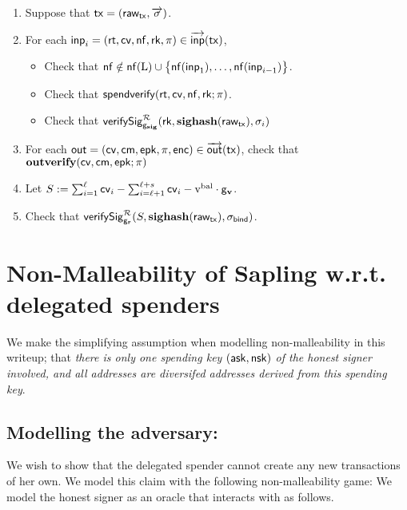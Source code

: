 \documentclass[11pt]{article}
\numberwithin{equation}{section} %
\numberwithin{figure}{section} %
\newcommand{\inp}{\ensuremath{\mathsf{inp}}\xspace}
\newcommand{\inps}{\ensuremath{\overrightarrow{\mathsf{inp}}}\xspace}
\newcommand{\outs}{\ensuremath{\overrightarrow{\mathsf{out}}}\xspace}
\newcommand{\out}{\ensuremath{\mathsf{out}}\xspace}
\newcommand{\set}[1]{\ensuremath{\left\{#1\right\}}\xspace}
\begin{document}
\begin{enumerate}
\item Suppose that $\mathsf{tx}=(\mathsf{raw_{tx}},\overrightarrow{\mathsf{\sigma}})$.
\item For each $\inp_i =(\rt,\cv,\nf,\rk,\prf)\in \inps(\tx)$,
 \begin{itemize}
  \item Check that $\nf \notin \nfof{\ledger}\cup \set{\nfof{\inp_1},\ldots,\nfof{\inp_{i-1}}}$.
  \item Check that $\mathsf{spendverify}(\mathsf{rt},\mathsf{cv},\mathsf{nf},\mathsf{rk};\pi)$.
  \item Check that $\mathsf{verifySig}^{\mathcal R}_{\mathsf{g}_{\mathbf{sig}}}(\mathsf{rk},\mathbf{sighash}(\mathsf{raw_{tx}}),\sigma_i)$
 \end{itemize}
\item For each $\out = (\cv,\cm,\epk,\prf,\noteenc)\in\outs(\tx)$, check that  $\mathbf{outverify}(\mathsf{cv},\mathsf{cm},\mathsf{epk};\pi)$
\item Let $S:=\sum_{i=1}^\ell \mathsf{cv}_i - \sum_{i=\ell+1}^{\ell+s}\mathsf{cv}_i-\mathrm{v^{bal}}\cdot \mathsf{g}_{\mathbf{v}}$.
\item Check that $\mathsf{verifySig}^{\mathcal R}_{\mathsf{g}_\mathbf{r}}(S,\mathbf{sighash}(\mathsf{raw_{tx}}),\sigma_{\mathsf{bind}})$.
\end{enumerate}







\section{Non-Malleability of Sapling w.r.t. delegated spenders}


We make the simplifying assumption when modelling non-malleability in this writeup; that \emph{there is only one spending key $(\mathsf{ask},\mathsf{nsk})$ of the honest signer  involved, and all addresses are diversifed addresses derived from this spending key}.
\subsection*{Modelling the adversary:}
We wish to show that the delegated spender cannot create any new transactions of her own.
We model this claim with the following non-malleability game:
We model the honest signer as an oracle \oracle that \adv interacts with as follows.
% 
\end{document}
